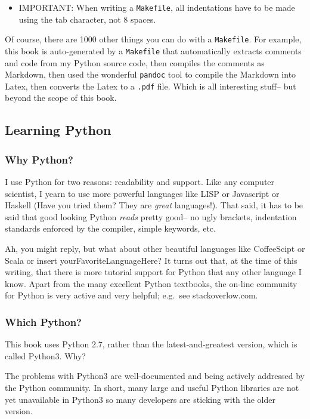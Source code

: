 \begin{itemize}
\itemsep1pt\parskip0pt
\item
  IMPORTANT: When writing a \texttt{Makefile}, all indentations have to
  be made using the tab character, not 8 spaces.
\end{itemize}

Of course, there are 1000 other things you can do with a
\texttt{Makefile}. For example, this book is auto-generated by a
\texttt{Makefile} that automatically extracts comments and code from my
Python source code, then compiles the comments as Markdown, then used
the wonderful \texttt{pandoc} tool to compile the Markdown into Latex,
then converts the Latex to a \texttt{.pdf} file. Which is all
interesting stuff-- but beyond the scope of this book.

\subsection{Learning Python}\label{learning-python}

\subsubsection{Why Python?}\label{why-python}

I use Python for two reasons: readability and support. Like any computer
scientist, I yearn to use more powerful languages like LISP or
Javascript or Haskell (Have you tried them? They are \emph{great}
languages!). That said, it has to be said that good looking Python
\emph{reads} pretty good-- no ugly brackets, indentation standards
enforced by the compiler, simple keywords, etc.

Ah, you might reply, but what about other beautiful languages like
CoffeeScipt or Scala or insert yourFavoriteLanguageHere? It turns out
that, at the time of this writing, that there is more tutorial support
for Python that any other language I know. Apart from the many excellent
Python textbooks, the on-line community for Python is very active and
very helpful; e.g.~see stackoverlow.com.

\subsubsection{Which Python?}\label{which-python}

This book uses Python 2.7, rather than the latest-and-greatest version,
which is called Python3. Why?

The problems with Python3 are well-documented and being actively
addressed by the Python community. In short, many large and useful
Python libraries are not yet unavailable in Python3 so many developers
are sticking with the older version.

